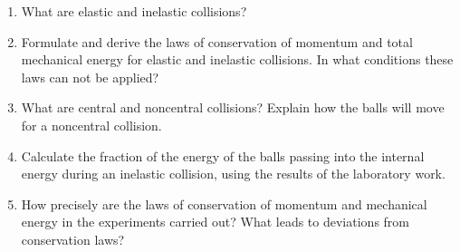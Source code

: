 \documentclass{LabWorkEng}
\begin{document}
\begin{enumerate}
	\item What are elastic and inelastic collisions?
	\item Formulate and derive the laws of conservation of momentum and total mechanical energy for elastic and inelastic collisions. In what conditions these laws can not be applied?
	\item What are central and noncentral collisions? Explain how the balls will move for a noncentral collision.
	\item Calculate the fraction of the energy of the balls passing into the internal energy during an inelastic collision, using the results of the laboratory work.
	\item How precisely are the laws of conservation of momentum and mechanical energy in the experiments carried out? What leads to deviations from conservation laws?
\end{enumerate}
\end{document}
